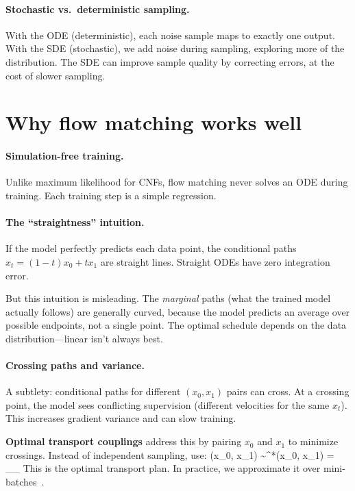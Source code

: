 \documentclass[11pt]{article}
\begin{document}
\paragraph{Stochastic vs.\ deterministic sampling.} With the ODE (deterministic), each noise sample maps to exactly one output. With the SDE (stochastic), we add noise during sampling, exploring more of the distribution. The SDE can improve sample quality by correcting errors, at the cost of slower sampling.

\section{Why flow matching works well}

\paragraph{Simulation-free training.} Unlike maximum likelihood for CNFs, flow matching never solves an ODE during training. Each training step is a simple regression.

\paragraph{The ``straightness'' intuition.} If the model perfectly predicts each data point, the conditional paths $x_t = (1-t)x_0 + tx_1$ are straight lines. Straight ODEs have zero integration error.

But this intuition is misleading. The \emph{marginal} paths (what the trained model actually follows) are generally curved, because the model predicts an average over possible endpoints, not a single point. The optimal schedule depends on the data distribution---linear isn't always best.

\paragraph{Crossing paths and variance.} A subtlety: conditional paths for different $(x_0, x_1)$ pairs can cross. At a crossing point, the model sees conflicting supervision (different velocities for the same $x_t$). This increases gradient variance and can slow training.

\textbf{Optimal transport couplings} address this by pairing $x_0$ and $x_1$ to minimize crossings. Instead of independent sampling, use:
\beq
(x_0, x_1) \sim \pi^*(x_0, x_1) = \argmin_\pi \E_\pi[\|x_0 - x_1\|^2]
\eeq
This is the optimal transport plan. In practice, we approximate it over mini-batches~\cite{tong2023improving}.
\end{document}
